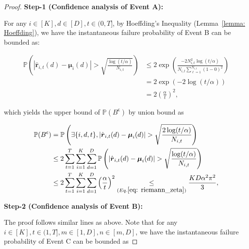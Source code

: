 \begin{proof}

\textbf{Step-1 (Confidence analysis of Event A):} 

For any $i \in [K], d \in [D], t \in (0,T]$, by Hoeffding’s Inequality (Lemma~\ref{lemma: Hoeffding}), we have the instantaneous failure probability of Event B can be bounded as:

\begin{equation}
\begin{aligned}
\mathbb{P} \left( | \hat{\boldsymbol{r}}_{i,t}(d) - \boldsymbol{\mu}_{i}(d) | > \sqrt{\frac{ \log(t/\alpha)}{N_{i,t}}} \right)
& \leq
2\exp \left( \frac{-2 N_{i,t}^2 \log(t/\alpha) }{ N_{i,t} \sum_{\ell=1}^{N_{i,t}}(1-0)^2 } \right) \\
& =
2\exp \left( -2 \log(t/\alpha) \right) \\
& =
2 \left( \frac{\alpha}{t} \right)^2,
\end{aligned}
\end{equation}

which yields the upper bound of $\mathbb{P} (B^\mathsf{c})$ by union bound as 

\begin{equation}
\begin{aligned}
\label{eq: conf_B_upbd}
\mathbb{P} (B^\mathsf{c}) 
& = 
\mathbb{P} \left( \exists \{i,d,t\}, | \hat{\boldsymbol{r}}_{i,t}(d) - \boldsymbol{\mu}_{i}(d) | > \sqrt{\frac{2 \log(t/\alpha)}{N_{i,t}}} \right) \\
& \leq
2 \sum_{t=1}^{T}
\sum_{i=1}^{K}
\sum_{d=1}^{D}
\mathbb{P} \left( | \hat{\boldsymbol{r}}_{i,t}(d) - \boldsymbol{\mu}_{i}(d) | > \sqrt{\frac{ \log(t/\alpha)}{N_{i,t}}} \right) \\
& \leq 
2 \sum_{t=1}^{T} \sum_{i=1}^{K} \sum_{d=1}^{D} \left( \frac{\alpha}{t} \right)^2
\underset{(Eq. \ref{eq: riemann_zeta})}{\leq }
\frac{KD \alpha^2 \pi^2}{3},
\end{aligned}
\end{equation}


\textbf{Step-2 (Confidence analysis of Event B):} 

The proof follows similar lines as above.
Note that for any $i \in [K], t \in (1,T], m \in [1, D], n \in [m, D]$, we have the instantaneous failure probability of Event C can be bounded as


\end{proof}
